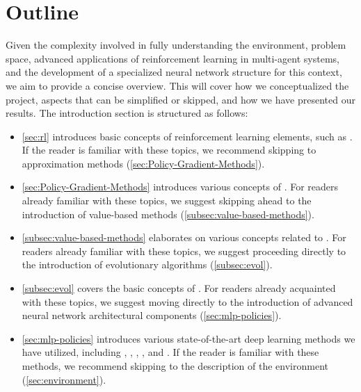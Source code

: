 \section{Outline}

\noindent Given the complexity involved in fully understanding the environment, problem space, advanced applications of reinforcement learning in multi-agent systems, and the development of a specialized neural network structure for this context, we aim to provide a concise overview. This will cover how we conceptualized the project, aspects that can be simplified or skipped, and how we have presented our results. The introduction section is structured as follows:

\begin{itemize}[itemsep=4pt, parsep=0pt]

\item \autoref{sec:rl} introduces basic concepts of reinforcement learning elements, such as . If the reader is familiar with these topics, we recommend skipping to approximation methods (\autoref{sec:Policy-Gradient-Methods}).

\item \autoref{sec:Policy-Gradient-Methods} introduces various concepts of . For readers already familiar with these topics, we suggest skipping ahead to the introduction of value-based methods (\autoref{subsec:value-based-methods}).

\item \autoref{subsec:value-based-methods} elaborates on various concepts related to . For readers already familiar with these topics, we suggest proceeding directly to the introduction of evolutionary algorithms (\autoref{subsec:evol}).

\item \autoref{subsec:evol} covers the basic concepts of . For readers already acquainted with these topics, we suggest moving directly to the introduction of advanced neural network architectural components (\autoref{sec:mlp-policies}).

\item \autoref{sec:mlp-policies} introduces various state-of-the-art deep learning methods we have utilized, including , , , ,  and . If the reader is familiar with these methods, we recommend skipping to the description of the environment (\autoref{sec:environment}).


\end{itemize}
